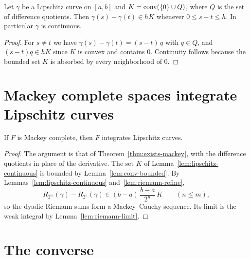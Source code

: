 \begin{lemma}
  \label{lem:lipschitz-continuous}
  \leanok
  Let $\gamma$ be a Lipschitz curve on $[a, b]$ and $K = \operatorname{conv}(\{0\} \cup Q)$, where $Q$ is the
  set of difference quotients. Then $\gamma(s) - \gamma(t) \in h K$ whenever
  $0 \leq s - t \leq h$. In particular $\gamma$ is continuous.
\end{lemma}

\begin{proof}
  \leanok
  For $s \neq t$ we have $\gamma(s) - \gamma(t) = (s - t)\, q$ with $q \in Q$, and
  $(s - t)q \in hK$ since $K$ is convex and contains $0$. Continuity follows because the
  bounded set $K$ is absorbed by every neighborhood of $0$.
\end{proof}

\section{Mackey complete spaces integrate Lipschitz curves}

\begin{theorem}
  \label{thm:mackey-to-lipschitz}
  \leanok
  If $F$ is Mackey complete, then $F$ integrates Lipschitz curves.
\end{theorem}

\begin{proof}
  \leanok
  The argument is that of Theorem~\ref{thm:exists-mackey}, with the difference quotients in
  place of the derivative. The set $K$ of Lemma~\ref{lem:lipschitz-continuous} is bounded by
  Lemma~\ref{lem:conv-bounded}. By Lemmas~\ref{lem:lipschitz-continuous}
  and~\ref{lem:riemann-refine},
  \[
    R_{2^m}(\gamma) - R_{2^n}(\gamma) \in (b - a)\,\frac{b - a}{2^n}\, K \qquad (n \leq m),
  \]
  so the dyadic Riemann sums form a Mackey--Cauchy sequence. Its limit is the weak integral by
  Lemma~\ref{lem:riemann-limit}.
\end{proof}

\section{The converse}

